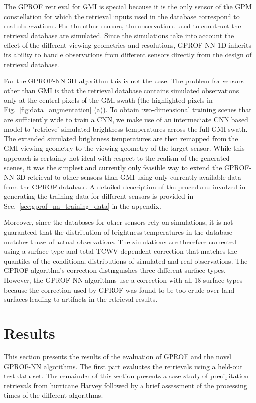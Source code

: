 \documentclass[journal abbreviation, manuscript]{copernicus}
\begin{document}
The GPROF retrieval for GMI is special because it is the only sensor of the GPM constellation for which the retrieval inputs used in the database correspond to real observations. For the other sensors, the observations used to construct the retrieval database are simulated. Since the simulations take into account the effect of the different viewing geometries and resolutions, GPROF-NN 1D inherits its ability to handle observations from different sensors directly from the design of retrieval database.

For the GPROF-NN 3D algorithm this is not the case. The problem for sensors other than GMI is that the retrieval database contains simulated observations only at the central pixels of the GMI swath (the highlighted pixels in Fig.~\ref{fig:data_augmentation} (a)). To obtain two-dimensional training scenes that are sufficiently wide to train a CNN, we make use of an intermediate CNN based model to 'retrieve' simulated brightness temperatures across the full GMI swath. The extended simulated brightness temperatures are then remapped from the GMI viewing geometry to the viewing geometry of the target sensor. While this approach is certainly not ideal with respect to the realism of the generated scenes, it was the simplest and currently only feasible way to extend the GPROF-NN 3D retrieval to other sensors than GMI using only currently available data from the GPROF database. A detailed description of the procedures involved in generating the training data for different sensors is provided in Sec.~\ref{sec:gprof_nn_training_data} in the appendix.

Moreover, since the databases for other sensors rely on simulations, it is not guaranteed that the distribution of brightness temperatures in the database matches those of actual observations. The simulations are therefore corrected using a surface type and total TCWV-dependent correction that matches the quantiles of the conditional distributions of simulated and real observations. The GPROF algorithm's correction distinguishes three different surface types. However, the GPROF-NN algorithms use a correction with all 18 surface types because the correction used by GPROF was found to be too crude over land surfaces leading to artifacts in the retrieval results.


\section{Results}

This section presents the results of the evaluation of GPROF and the novel
GPROF-NN algorithms. The first part evaluates the retrievals using a held-out
test data set. The remainder of this section presents a case study of
precipitation retrievals from hurricane Harvey followed by a brief assessment of
the processing times of the different algorithms.
\end{document}

